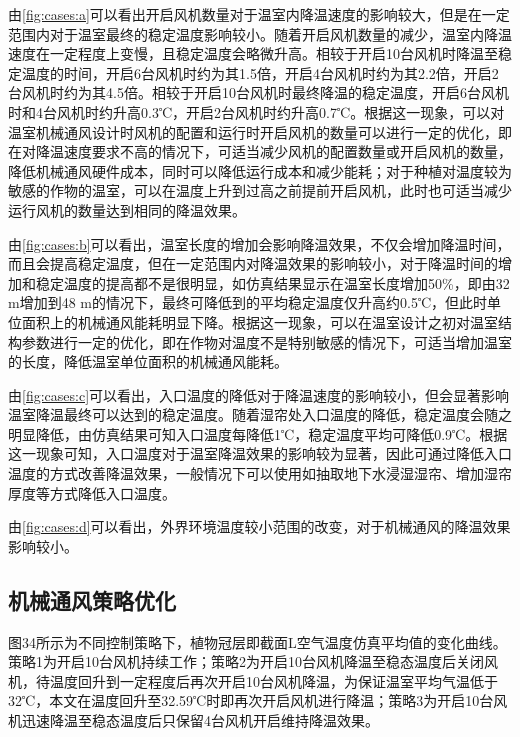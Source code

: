由\ref{fig:cases:a}可以看出开启风机数量对于温室内降温速度的影响较大，但是在一定范围内对于温室最终的稳定温度影响较小。随着开启风机数量的减少，温室内降温速度在一定程度上变慢，且稳定温度会略微升高。相较于开启10台风机时降温至稳定温度的时间，开启6台风机时约为其1.5倍，开启4台风机时约为其2.2倍，开启2台风机时约为其4.5倍。相较于开启10台风机时最终降温的稳定温度，开启6台风机时和4台风机时约升高0.3℃，开启2台风机时约升高0.7℃。根据这一现象，可以对温室机械通风设计时风机的配置和运行时开启风机的数量可以进行一定的优化，即在对降温速度要求不高的情况下，可适当减少风机的配置数量或开启风机的数量，降低机械通风硬件成本，同时可以降低运行成本和减少能耗；对于种植对温度较为敏感的作物的温室，可以在温度上升到过高之前提前开启风机，此时也可适当减少运行风机的数量达到相同的降温效果。

由\ref{fig:cases:b}可以看出，温室长度的增加会影响降温效果，不仅会增加降温时间，而且会提高稳定温度，但在一定范围内对降温效果的影响较小，对于降温时间的增加和稳定温度的提高都不是很明显，如仿真结果显示在温室长度增加50\%，即由32 m增加到48 m的情况下，最终可降低到的平均稳定温度仅升高约0.5℃，但此时单位面积上的机械通风能耗明显下降。根据这一现象，可以在温室设计之初对温室结构参数进行一定的优化，即在作物对温度不是特别敏感的情况下，可适当增加温室的长度，降低温室单位面积的机械通风能耗。

由\ref{fig:cases:c}可以看出，入口温度的降低对于降温速度的影响较小，但会显著影响温室降温最终可以达到的稳定温度。随着湿帘处入口温度的降低，稳定温度会随之明显降低，由仿真结果可知入口温度每降低1℃，稳定温度平均可降低0.9℃。根据这一现象可知，入口温度对于温室降温效果的影响较为显著，因此可通过降低入口温度的方式改善降温效果，一般情况下可以使用如抽取地下水浸湿湿帘、增加湿帘厚度等方式降低入口温度。

由\ref{fig:cases:d}可以看出，外界环境温度较小范围的改变，对于机械通风的降温效果影响较小。

	\subsection{机械通风策略优化}
	图34所示为不同控制策略下，植物冠层即截面L空气温度仿真平均值的变化曲线。策略1为开启10台风机持续工作；策略2为开启10台风机降温至稳态温度后关闭风机，待温度回升到一定程度后再次开启10台风机降温，为保证温室平均气温低于32℃，本文在温度回升至32.59℃时即再次开启风机进行降温；策略3为开启10台风机迅速降温至稳态温度后只保留4台风机开启维持降温效果。
	
